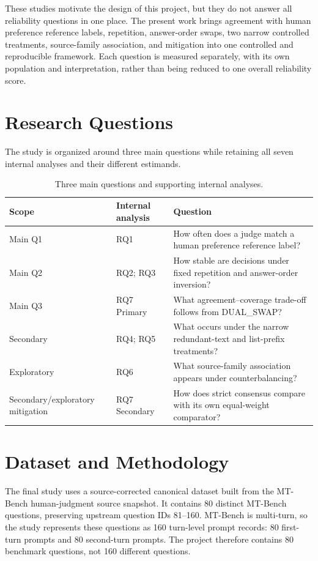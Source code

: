 \documentclass[11pt,a4paper]{article}
\begin{document}
These studies motivate the design of this project, but they do not answer all reliability questions in one place. The present work brings agreement with human preference reference labels, repetition, answer-order swaps, two narrow controlled treatments, source-family association, and mitigation into one controlled and reproducible framework. Each question is measured separately, with its own population and interpretation, rather than being reduced to one overall reliability score.

\section{Research Questions}

The study is organized around three main questions while retaining all seven internal analyses and their different estimands.

\begin{table}[H]
\centering
\small
\caption{Three main questions and supporting internal analyses.}
\begin{tabularx}{\textwidth}{@{}p{}p{}X@{}}
\toprule
Scope & Internal analysis & Question \\
\midrule
Main Q1 & RQ1 & How often does a judge match a human preference reference label?\\
Main Q2 & RQ2; RQ3 & How stable are decisions under fixed repetition and answer-order inversion?\\
Main Q3 & RQ7 Primary & What agreement--coverage trade-off follows from DUAL\_SWAP?\\
Secondary & RQ4; RQ5 & What occurs under the narrow redundant-text and list-prefix treatments?\\
Exploratory & RQ6 & What source-family association appears under counterbalancing?\\
Secondary/exploratory mitigation & RQ7 Secondary & How does strict consensus compare with its own equal-weight comparator?\\
\bottomrule
\end{tabularx}
\end{table}

\section{Dataset and Methodology}

The final study uses a source-corrected canonical dataset built from the MT-Bench human-judgment source snapshot. It contains 80 distinct MT-Bench questions, preserving upstream question IDs 81--160. MT-Bench is multi-turn, so the study represents these questions as 160 turn-level prompt records: 80 first-turn prompts and 80 second-turn prompts. The project therefore contains 80 benchmark questions, not 160 different questions.
\end{document}
